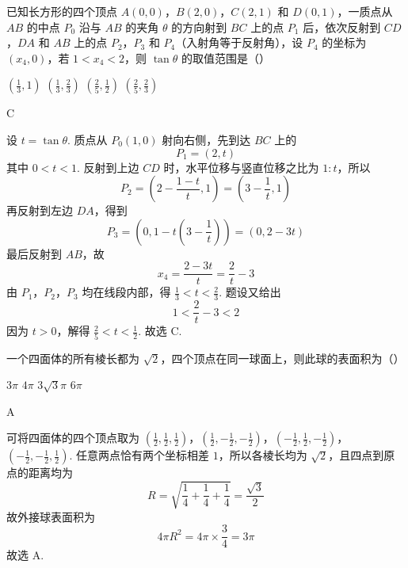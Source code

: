 \begin{problem}
已知长方形的四个顶点 \(A(0,0)\)，\(B(2,0)\)，\(C(2,1)\) 和 \(D(0,1)\)，一质点从 \(AB\) 的中点 \(P_0\) 沿与 \(AB\) 的夹角 \(\theta\) 的方向射到 \(BC\) 上的点 \(P_1\) 后，依次反射到 \(CD\)，\(DA\) 和 \(AB\) 上的点 \(P_2\)，\(P_3\) 和 \(P_4\)（入射角等于反射角），设 \(P_4\) 的坐标为 \((x_4,0)\)，若 \(1 < x_4 < 2\)，则 \(\tan \theta\) 的取值范围是（\quad）

\choices
    {\(\left(\frac{1}{3},1\right)\)}
    {\(\left(\frac{1}{3},\frac{2}{3}\right)\)}
    {\(\left(\frac{2}{5},\frac{1}{2}\right)\)}
    {\(\left(\frac{2}{5},\frac{2}{3}\right)\)}
\end{problem}

\begin{answer}
C
\end{answer}

\begin{solution}
设 \(t=\tan\theta\). 质点从 \(P_0(1,0)\) 射向右侧，先到达 \(BC\) 上的
\[
P_1=(2,t)
\]
其中 \(0<t<1\).
反射到上边 \(CD\) 时，水平位移与竖直位移之比为 \(1:t\)，所以
\[
P_2=\left(2-\frac{1-t}{t},1\right)=\left(3-\frac1t,1\right)
\]
再反射到左边 \(DA\)，得到
\[
P_3=\left(0,1-t\left(3-\frac1t\right)\right)=(0,2-3t)
\]
最后反射到 \(AB\)，故
\[
x_4=\frac{2-3t}{t}=\frac2t-3
\]
由 \(P_1\)，\(P_2\)，\(P_3\) 均在线段内部，得 \(\frac13<t<\frac23\). 题设又给出
\[
1<\frac2t-3<2
\]
因为 \(t>0\)，解得 \(\frac25<t<\frac12\). 故选 C.
\end{solution}

\begin{problem}
一个四面体的所有棱长都为 \(\sqrt{2}\)，四个顶点在同一球面上，则此球的表面积为（\quad）

\choices
    {\(3\pi\)}
    {\(4\pi\)}
    {\(3\sqrt{3}\pi\)}
    {\(6\pi\)}
\end{problem}

\begin{answer}
A
\end{answer}

\begin{solution}
可将四面体的四个顶点取为
\(\left(\frac12,\frac12,\frac12\right)\)，\(\left(\frac12,-\frac12,-\frac12\right)\)，\(\left(-\frac12,\frac12,-\frac12\right)\)，\(\left(-\frac12,-\frac12,\frac12\right)\).
任意两点恰有两个坐标相差 \(1\)，所以各棱长均为 \(\sqrt2\)，且四点到原点的距离均为
\[
R=\sqrt{\frac14+\frac14+\frac14}=\frac{\sqrt3}{2}
\]
故外接球表面积为
\[
4\pi R^2=4\pi\times\frac34=3\pi
\]
故选 A.
\end{solution}

